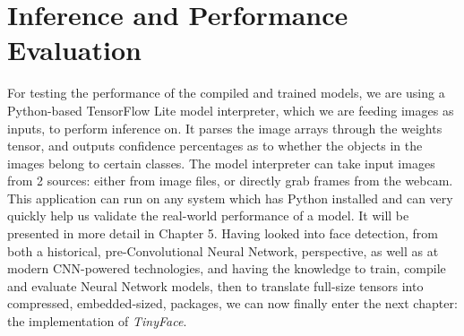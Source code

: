 \section{Inference and Performance Evaluation}
For testing the performance of the compiled and trained models, we are using a Python-based TensorFlow Lite model interpreter, which we are feeding images as inputs, to perform inference on. It parses the image arrays through the weights tensor, and outputs confidence percentages as to whether the objects in the images belong to certain classes. The model interpreter can take input images from 2 sources: either from image files, or directly grab frames from the webcam. This application can run on any system which has Python installed and can very quickly help us validate the real-world performance of a model. It will be presented in more detail in Chapter 5. 
\newpage
Having looked into face detection, from both a historical, pre-Convolutional Neural Network, perspective, as well as at modern CNN-powered technologies, and having the knowledge to train, compile and evaluate Neural Network models, then to translate full-size tensors into compressed, embedded-sized, packages, we can now finally enter the next chapter: the implementation of \textit{TinyFace}.
